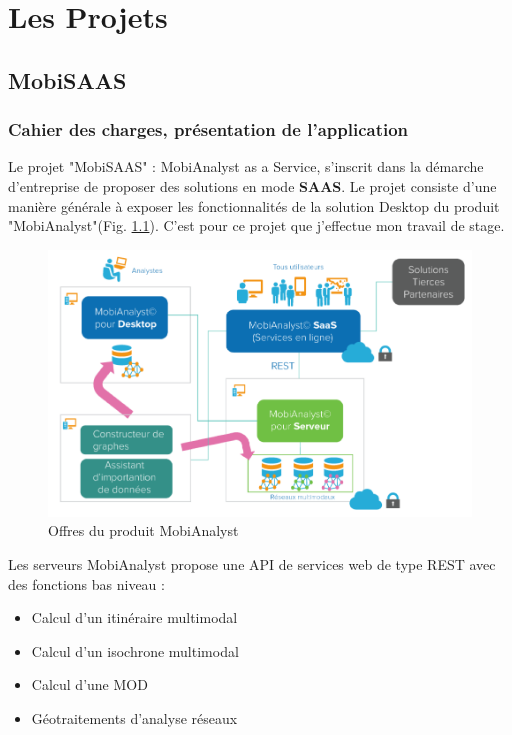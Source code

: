 \chapter{Les Projets}
\label{Developpement}

\section{MobiSAAS}

\subsection{Cahier des charges, présentation de l'application}

Le projet "MobiSAAS" : MobiAnalyst as a Service, s'inscrit dans la démarche d'entreprise de proposer des solutions en mode \textbf{SAAS}. Le projet consiste d'une manière générale à exposer les fonctionnalités de la solution Desktop du produit "MobiAnalyst"(Fig. \ref{OffreMobiAnalyst}). C'est pour ce projet que j'effectue mon travail de stage.\\

\begin{figure}[!h]
\centering
\includegraphics[width=14cm]{images/offre_MobiAnalyst.png}
\caption{\label{OffreMobiAnalyst}Offres du produit MobiAnalyst}
\end{figure} 

Les serveurs MobiAnalyst propose une API de services web de type REST avec des fonctions bas niveau :
\begin{itemize}
\item Calcul d’un itinéraire multimodal 
\item Calcul d’un isochrone multimodal
\item Calcul d’une MOD
\item Géotraitements d’analyse réseaux 
\end{itemize}

